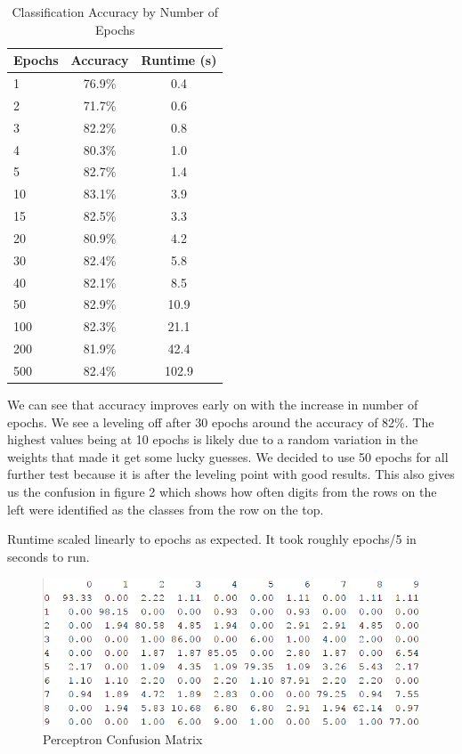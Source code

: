 \documentclass{article}[12pt]
\begin{document}
      \begin{table}[ht]
   	\centering
   	\begin{tabular}{l | c | c}
   		\hline
   		 Epochs  & Accuracy & Runtime (s)\\
   		\hline \hline \hline
   		1 & 76.9\% & 0.4\\
   		2 & 71.7\% &0.6\\
   		3 & 82.2\% &0.8\\
   		4 & 80.3\% &1.0\\
   		5 & 82.7\% &1.4\\
   		10 & 83.1\% &3.9\\
   		15 & 82.5\% &3.3\\
   		20 & 80.9\% &4.2\\
   		30 & 82.4\% &5.8\\
   		40 & 82.1\% &8.5\\
   		50 & 82.9\% &10.9\\
   		100 & 82.3\% &21.1\\
   		200 & 81.9\% &42.4\\
   		500 & 82.4\% &102.9\\
   		\hline
   	\end{tabular}
   	\caption{Classification Accuracy by Number of Epochs} \label{tab:digacc}
   \end{table}
   
   We can see that accuracy improves early on with the increase in number of epochs. We see a leveling off after 30 epochs around the accuracy of 82\%. The highest values being at 10 epochs is likely due to a random variation in the weights that made it get some lucky guesses. We decided to use 50 epochs for all further test because it is after the leveling point with good results. This also gives us the confusion  in figure 2 which shows how often digits from the rows on the left were identified as the classes from the row on the top.
   
   Runtime scaled linearly to epochs as expected. It took roughly epochs/5 in seconds to run. 

   
      \begin{figure}[!htb]
   	\centering
   	\includegraphics[scale=0.7]{confusion.png}
   	\caption{Perceptron Confusion Matrix}
   	\label{fig:cm11}
   \end{figure}
   
\end{document}
